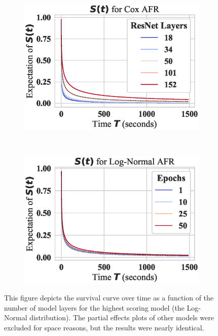 \begin{figure}
    \begin{subfigure}[t]{0.5\textwidth}
        \centering\includegraphics[width=\textwidth]{mnist/log_normal_layers_partial_effect.eps}
    \end{subfigure}
    ~
    \begin{subfigure}[t]{0.5\textwidth}
        \centering\includegraphics[width=\textwidth]{mnist/log_normal_epochs_partial_effect.eps}
    \end{subfigure}
    \label{mnist_partial_effect}
    \caption{This figure depicts the survival curve over time as a function of the number of model layers for the highest scoring model (the Log-Normal distribution). The partial effects plots of other models were excluded for space reasons, but the results were nearly identical.}
\end{figure}


